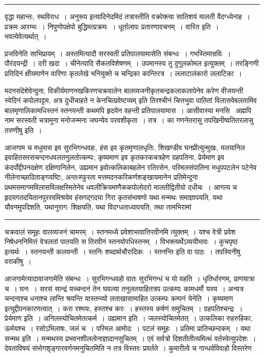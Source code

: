 \documentclass[11pt, openany]{book}
\begin{document}
\vspace{2mm}
\hrule

\noindent
{\s वृद्धा महान्तः, स्थविराध~। अनुरूप इत्यादिनेदमिदं तत्रास्तीति वक्रोक्त्या सातिशयं मालती वैदग्ध्येनाह~। प्रक्रम आरम्भः~। निपुणोपक्षेपो बुद्धिमत्प्रक्रमः~। धूर्तालापः प्रतारणावचनम्~। {\qtt वारित इति}~। भवत्येवेत्यर्थात्~।

प्रजविनेति साभिप्रायम्~। अस्तमित्यादौ सरस्वती प्रतिपालयामासेति संबन्धः~। गभस्तिमान्रविः~। पौरंदयन्द्री~। दरी खदा~। चीनेत्यादि सैकतविशेषणम्~। उपमानस्य तु दुगूलकोमल इत्युक्तम्~। तरङ्गिणी प्रतिदिनं क्षीयमाणेन वारिणा कृतलेखे भनियुक्ते च चन्द्रिका कान्तिरत्र~। ललाटालंकारो ललाटिका~।}

\newpage

\noindent
मदनसंदेशेवेन्दुना, विकीर्यमाणनखकिरणचक्रवालेन बालव्यजनीकृतचन्द्रकलाकलापेनेव करेण वीजयन्ती स्वेदिनं कपोलपट्टम, {\haq अत्र दुधीचाहते न केनचित्प्रवेष्टव्यम्} इति तिरश्चीनं चित्तभुवा पातितां विलासवेबलतामिव बालमृणालिकामधिस्तनं स्तनयन्ती कथमपि हृदयेन वहन्ती प्रतिपालयामास~। आसीवास्या मनसि \textendash\ अह्मपि नाम सरस्वती चत्रामुना मनोजन्मना जघन्येव परवशीकृता~। तत्र~। का गणनेतरासु तपखिनीष्वतितरलासु तरुणीषु इति~।

आजगाम च मधुमास इव सुरभिगन्धवहः, हंस इव कृतमृणालधृतिः, शिखण्डीव घनप्रीत्युन्मुखः, मलयानिल इवाहितसरसचन्दनधवलतनुलतोत्कम्पः, कृष्यमाण इव कृतकरकचत्रहेण ग्रहपतिना, प्रेर्यमाण इव कंदर्पोद्दीपनदक्षेण दक्षिणानिलेन, उह्यमान इवोत्कलिकाबहलेन रतिरसेन, परिमलसंपातिना मधुपपटलेन पटेनेव नीलेनाच्छादिताङ्गयष्टिः, अन्तःस्फुरता मत्तमदनकरिकर्णशङ्खायमानेन प्रतिमेन्दुना प्रथमसमागमविलासविलक्षस्मितेनेव धवलीक्रियमाणैककपोलोदरो मालतीद्वितीयो दधीचः~। आगत्य च हृदयगतदयितानपुररवमिश्रयेव हंसगद्गदया गिरा कृतसंभाषणो यथा मन्मथः समाज्ञापयति, यथा यौवनमुपदिशति, यथानुराग: शिक्षयति, यथा विदग्धताध्यापयति, तथा तामभिरामां

\vspace{2mm}
\hrule

\noindent
{\s चक्रवालं समूहः वालव्यजनं चामरम्~। स्तनमध्ये प्रवेशाभावात्तिरवीनमि त्युक्तम्~। यश्च वेत्री प्रवेश निषेधननिमित्तं वेत्रलतां पातयति स तिरवीनं स्तनयोरधिस्तनम्~। विभक्त्यर्थेऽव्ययीभावः~। कुचपृष्ठ इत्यर्थः~। स्तनयन्ती कलयन्ती~। स्तनिः शब्दार्थचौरादिकः~। {\qt स्तनन्ति} इति वा पाठः~। तपस्विनीषु वराकीषु~।

आजगामेत्यादावाजगामेति संबन्धः~। सुरभिगन्धवहो वातः सुरभिगन्धं च यो वहति~। धृतिर्धारणम्, प्राणयात्रा च~। घनः~। सरसं सान्द्रं यच्चन्दनं तेन घवल्या तनुलतयाहितत्रप उत्कम्पः कामधर्मो यस्य~। अन्यत्र चन्दनाश्च धनाश्च लान्ति श्रयन्ति यास्तन्व्यो लताखासामाहित उत्कम्पः कम्पनं येनेति~। कृष्यमाण इत्युद्दीपनकारणत्वात्~। करा रश्मयः, हस्तश्च करः~। हस्तस्य कर्षणं समुचितम्~। ग्रहपतिश्चन्द्रः~। {\qtt प्रेर्यमाण इति}~। अनिलस्योचितमेतत्कर्म~। {\qtt उह्यमान इति}~। जलस्योचितमेतत्~। उत्कलिका रुहरुहिका, ऊर्मयश्च~। रसोऽभिलाषः, जलं च~। परिमल आमोदः~। पटलं समूहः~। प्रतिमा प्रातिच्छन्दकम्~। {\qtt यथा सन्मथ इति}~। मन्मथस्य प्रभवनशीलत्वेनाज्ञादानसुचितम्~। एवं सर्वत्रो दिशतीतीत्यमित्थं वर्तस्वेत्युपदेशः~। देवताविषयं संभोगशृङ्गारवर्णनमनुचितमिति न तत्र विस्तरः प्रवर्तते~। कुमारीत्वे च गान्धर्वविवाहो विस्तरेण}
\end{document}

